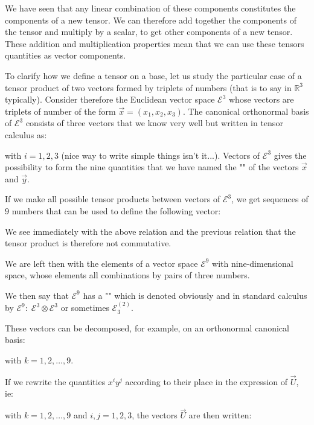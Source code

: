 	We have seen that any linear combination of these components constitutes the components of a new tensor. We can therefore add together the components of the tensor and multiply by a scalar, to get other components of a new tensor. These addition and multiplication properties mean that we can use these tensors quantities as vector components.
	
	To clarify how we define a tensor on a base, let us study the particular case of a tensor product of two vectors formed by triplets of numbers (that is to say in $\mathbb{R}^3$ typically). Consider therefore the Euclidean vector space $\mathcal{E}^3$ whose vectors are triplets of number of the form $\vec{x}=(x_1,x_2,x_3)$. The canonical orthonormal basis of $\mathcal{E}^3$ consists of three vectors that we know very well but written in tensor calculus as:
	
	with $i=1,2,3$ (nice way to write simple things isn't it...).
	Vectors of $\mathcal{E}^3$ gives the possibility to form the nine quantities that we have named the "" of the vectors $\vec{x}$ and $\vec{y}$.
	
	If we make all possible tensor products between vectors of $\mathcal{E}^3$, we get sequences of $9$ numbers that can be used to define the following vector:
		
	\begin{tcolorbox}[title=Remark,colframe=black,arc=10pt]
	We see immediately with the above relation and the previous relation that the tensor product is therefore not commutative.
	\end{tcolorbox}
	We are left then with the elements of a vector space $\mathcal{E}^9$ with nine-dimensional space, whose elements all combinations by pairs of three numbers.
	
	We then say that $\mathcal{E}^9$ has a "" which is denoted obviously and in standard calculus by $\mathcal{E}^9:\; \mathcal{E}^3\otimes \mathcal{E}^3$ or sometimes $\mathcal{E}_3^{(2)}$.

	These vectors can be decomposed, for example, on an orthonormal canonical basis:
	
	with $k=1,2,\ldots,9$.

	If we rewrite the quantities $x^iy^j$ according to their place in the expression of $\vec{U}$, ie:
	
	with $k=1,2,\ldots,9$ and $i,j=1,2,3$, the vectors $\vec{U}$ are then written:
	
